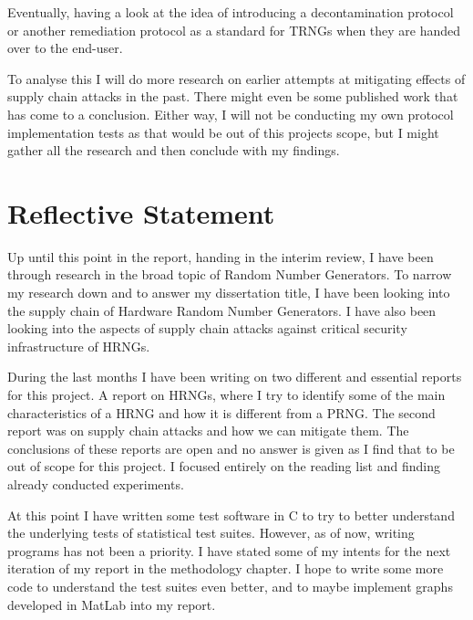 \documentclass[]{final_report}
\begin{document}
\par{Eventually, having a look at the idea of introducing a decontamination protocol or another remediation protocol as a standard for TRNGs when they are handed over to the end-user.}

\par{To analyse this I will do more research on earlier attempts at mitigating effects of supply chain attacks in the past. There might even be some published work that has come to a conclusion. Either way, I will not be conducting my own protocol implementation tests as that would be out of this projects scope, but I might gather all the research and then conclude with my findings.}
	
\chapter*{Reflective Statement}

\par{Up until this point in the report, handing in the interim review, I have been through research in the broad topic of Random Number Generators. To narrow my research down and to answer my dissertation title, I have been looking into the supply chain of Hardware Random Number Generators. I have also been looking into the aspects of supply chain attacks against critical security infrastructure of HRNGs.}

\par{During the last months I have been writing on two different and essential reports for this project. A report on HRNGs, where I try to identify some of the main characteristics of a HRNG and how it is different from a PRNG. The second report was on supply chain attacks and how we can mitigate them. The conclusions of these reports are open and no answer is given as I find that to be out of scope for this project. I focused entirely on the reading list and finding already conducted experiments.}

\par{At this point I have written some test software in C to try to better understand the underlying tests of statistical test suites. However, as of now, writing programs has not been a priority. I have stated some of my intents for the next iteration of my report in the methodology chapter. I hope to write some more code to understand the test suites even better, and to maybe implement graphs developed in MatLab into my report.}
\end{document}
